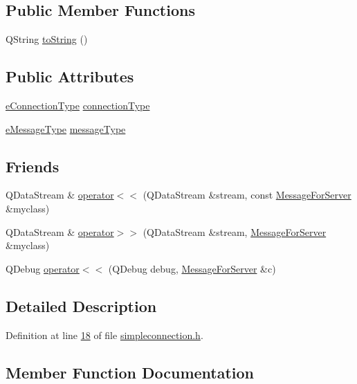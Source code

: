 \subsection*{Public Member Functions}
\begin{DoxyCompactItemize}
\item 
Q\+String \hyperlink{a00121_a9b98301583759754caf829cc1ed1520d}{to\+String} ()
\end{DoxyCompactItemize}
\subsection*{Public Attributes}
\begin{DoxyCompactItemize}
\item 
\hyperlink{a00008_ab66d8802c50493de7d50e181d6f8e296}{e\+Connection\+Type} \hyperlink{a00121_a32f7c4034883ac363ca247c8a2843040}{connection\+Type}
\item 
\hyperlink{a00008_a700ed30d49bfe436323e17539d3a0010}{e\+Message\+Type} \hyperlink{a00121_a77e3d9ee30093b40db7f2d8f5d7590aa}{message\+Type}
\end{DoxyCompactItemize}
\subsection*{Friends}
\begin{DoxyCompactItemize}
\item 
Q\+Data\+Stream \& \hyperlink{a00121_a0562e6e482b8c98c43d4351d63fe9a97}{operator$<$$<$} (Q\+Data\+Stream \&stream, const \hyperlink{a00121}{Message\+For\+Server} \&myclass)
\item 
Q\+Data\+Stream \& \hyperlink{a00121_a80c0e129812710b29e5cabd9e412387b}{operator$>$$>$} (Q\+Data\+Stream \&stream, \hyperlink{a00121}{Message\+For\+Server} \&myclass)
\item 
Q\+Debug \hyperlink{a00121_ab72134ee0c57b530f11fe2f24c205979}{operator$<$$<$} (Q\+Debug debug, \hyperlink{a00121}{Message\+For\+Server} \&c)
\end{DoxyCompactItemize}


\subsection{Detailed Description}


Definition at line \hyperlink{a00008_source_l00018}{18} of file \hyperlink{a00008_source}{simpleconnection.\+h}.



\subsection{Member Function Documentation}
\mbox{\label{a00121_a9b98301583759754caf829cc1ed1520d}} 
